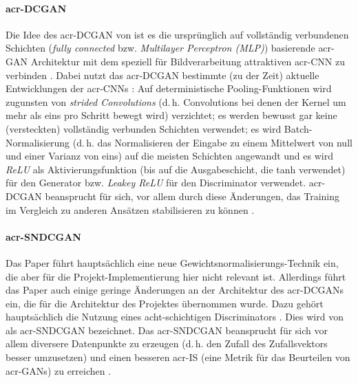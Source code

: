 \paragraph{\gls{acr-DCGAN}} Die Idee des \gls{acr-DCGAN} von
\citeauthor{radford2015unsupervised} \cite{radford2015unsupervised} ist es die
ursprünglich \cite[vgl.][]{goodfellow2014generative} auf vollständig verbundenen
Schichten (\emph{fully connected} bzw. \emph{Multilayer Perceptron (MLP)})
basierende \gls{acr-GAN} Architektur mit dem speziell für Bildverarbeitung
attraktiven \gls{acr-CNN} zu verbinden \cite[S. 1]{radford2015unsupervised}.
Dabei nutzt das \gls{acr-DCGAN} bestimmte (zu der Zeit) aktuelle Entwicklungen
der \gls{acr-CNN}s \cite[vgl.][S. 3]{radford2015unsupervised}: Auf
deterministische Pooling-Funktionen wird zugunsten von \emph{strided
Convolutions} (d.\,h. Convolutions bei denen der Kernel um mehr als eins pro
Schritt bewegt wird) verzichtet; es werden bewusst gar keine (versteckten)
vollständig verbunden Schichten verwendet; es wird Batch-Normalisierung (d.\,h.
das Normalisieren der Eingabe zu einem Mittelwert von null und einer Varianz von
eins) auf die meisten Schichten angewandt und es wird \emph{ReLU} als
Aktivierungsfunktion (bis auf die Ausgabeschicht, die tanh verwendet) für den
Generator bzw. \emph{Leakey ReLU} für den Discriminator verwendet.
\gls{acr-DCGAN} beansprucht für sich, vor allem durch diese Änderungen, das
Training im Vergleich zu anderen Ansätzen stabilisieren zu können \cite[S.
9]{radford2015unsupervised}.

\paragraph{\gls{acr-SNDCGAN}} Das Paper 
\cite{miyato2018spectral} führt hauptsächlich eine neue
Gewichtsnormalisierungs-Technik ein, die aber für die
Pro\-jekt-Imp\-le\-men\-tier\-ung hier nicht relevant ist. Allerdings führt das
Paper auch einige geringe Änderungen an der Architektur des \gls{acr-DCGAN}s
ein, die für die Architektur des Projektes übernommen wurde. Dazu gehört
hauptsächlich die Nutzung eines acht-schichtigen Discriminators \cite[S.
3]{kurach2018gan}. Dies wird von \citeauthor{kurach2018gan} \cite{kurach2018gan}
als \gls{acr-SNDCGAN} bezeichnet. Das \gls{acr-SNDCGAN} beansprucht für sich vor
allem diversere Datenpunkte zu erzeugen (d.\,h. den Zufall des Zufallsvektors
besser umzusetzen) und einen besseren \gls{acr-IS} (eine Metrik für das
Beurteilen von \gls{acr-GAN}s) zu erreichen \cite[S. 11]{miyato2018spectral}.

